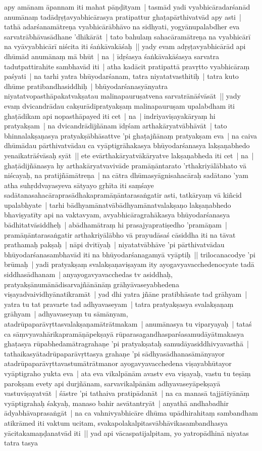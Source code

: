 \documentclass[article,12pt,a4paper]{memoir}%
\newcommand{\persName}[1]{#1}
\begin{document}
apy amānam āpannam iti mahat pāṇḍityam | tasmād yadi vyabhicāradarśanād anumānaṃ tadādṛṣṭavyabhicārasya pratipattur ghaṭapārthivatvād apy asti | tathā adarśanamātreṇa vyabhicārābhāvo na sidhyati, yogyānupalabdher eva sarvatrābhāvasādhane 'dhikārāt | tato bahulaṃ sahacāramātreṇa na vyabhicārī na vyāvyabhicārī niścita iti śaṅkāvakāśaḥ || \label{thakur75-108.25} yady evam adṛṣṭavyabhicārād api dhūmād anumānaṃ mā bhūt | na | īdṛśasya śaṅkāvakāśasya sarvatra tadutpattirahite sambhavād iti | atha kadācit pratipattā pravṛtto vyabhicāraṃ paśyati | na tarhi yatra bhūyodarśanam, tatra niyatatvasthitiḥ | tatra kuto dhūme pratibandhasiddhiḥ | bhūyodarśanasyānyatra niyatatvopasthāpakatvakṣatau malinapauruṣatvena sarvatrānāśvāsāt || \label{thakur75-108.30} yady evaṃ dvicandrādau cakṣurādipratyakṣaṃ malinapauruṣam upalabdham iti ghaṭādikam api nopasthāpayed iti cet | na | indriyaviṣayakāryaṃ hi pratyakṣam | na dvicandrādijñānam īdṛśam arthakāryatvābhāvāt | tato bhinnalakṣaṇasya pratyakṣābhāsattve 'pi ghaṭajñānaṃ pratyakṣam eva | na caiva dhūmādau pārthivatvādau ca vyāptigrāhakasya bhūyodarśanasya lakṣaṇabhedo yenaikatrāśvāsaḥ syāt || \label{thakur75-109.4} ete evārthakāryatvākāryatve lakṣaṇabheda iti cet | na | ghaṭādijñānasya hy arthakāryatvavivāde pramāṇāntarato 'rthakriyālābhato vā niścayaḥ, na pratijñāmātreṇa | na cātra dhūmasyāgnisahacāraḥ sadātano 'yam atha suhṛddvayasyeva sātyayo gṛhīta iti saṃśaye sadātanasahacāraprasādhakapramāṇāntarasaṅgatir asti, tatkāryaṃ vā kiñcid upalabhyate | tarhi bādhyamānatvābādhyamānatvalakṣaṇo lakṣaṇabhedo bhaviṣyatīty api na vaktavyam, avyabhicāragrahākasya bhūyodarśanasya bādhitatvāsiddheḥ | abādhamātraṃ hi prasajyapratiṣedho 'pramāṇam | pramāṇāntarasaṅgatir arthakriyālābho vā prayudāsaś cāsiddha iti na tāvat prathamaḥ pakṣaḥ | nāpi dvitīyaḥ | niyatatvābhāve 'pi pārthivatvādau bhūyodarśanasambhavād iti na bhūyodarśanagamyā vyāptiḥ || \label{thakur75-109.13} \persName{trilocana}codye 'pi brūmaḥ | yadi pratyakṣaṃ svalakṣaṇaviṣayam ity ayogavyavacchedenocyate tadā siddhasādhanam | anyayogavyavacchedas tv asiddhaḥ, pratyakṣānumānādisarvajñānānāṃ grāhyāvaseyabhedena viṣayadvaividhyānatikramāt | yad dhi yatra jñāne pratibhāsate tad grāhyam | yatra tu tat pravarte tad adhyavaseyam | tatra pratyakṣasya svalakṣaṇaṃ grāhyam | adhyavaseyaṃ tu sāmānyam, atadrūpaparāvṛttasvalakṣaṇamātrātmakam | anumānasya tu viparyayaḥ | tataś ca sāṃvyavahārikapramāṇāpekṣayā rūparasagandhasparśasamudāyātmakasya ghaṭasya rūpabhedamātragrahaṇe 'pi pratyakṣataḥ samudāyasiddhivyavasthā | tathaikasyātadrūpaparāvṛttasya grahaṇe 'pi sādhyasādhanasāmānyayor atadrūpaparāvṛttavastumātrātmanor ayogavyavacchedena viṣayabhūtayor vyāptigraho yukta eva | ata eva vikalpānām avastv eva viṣayaḥ, vastu tu teṣāṃ parokṣam evety api durjñānam, sarvavikalpānām adhyavaseyāpekṣayā vastuviṣayatvāt | śāstre 'pi tathaiva pratipādanāt | na ca manasā tajjātīyānāṃ vyāptigrahaḥ śakyaḥ, manaso bahir asvātantryāt | anyathā andhabadhir ādyabhāvaprasaṅgāt | na ca vahnivyabhicāre dhūma upādhirahitaṃ sambandham atikrāmed iti vaktum ucitam, svakapolakalpitasvābhāvikasambandhasya yācitakamaṇḍanatvād iti || \label{thakur75-109.27} yad api vācaspatijalpitam, yo yatropādhinā niyatas tatra tasya 
\end{document}
